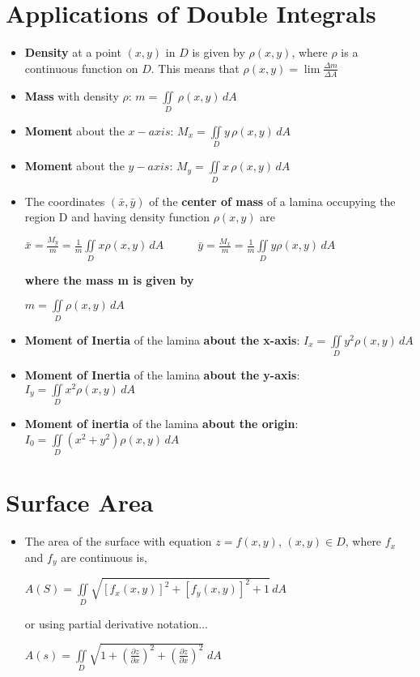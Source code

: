 \documentclass{report}
\begin{document}
	\section{Applications of Double Integrals}
		\begin{itemize}\addtolength{\leftskip}{2em}
			\item \textbf{Density} at a point $(x,y)$ in $D$ is given by $\rho(x,y)$, where $\rho$ is a continuous function on $D$. This means that $\rho(x,y)=\lim \frac{\Delta m}{\Delta A}$
			\item \textbf{Mass} with density $\rho$: $m=\iint\limits_{D}\,\rho(x,y)\,dA$
			\item \textbf{Moment} about the $x-axis$: $M_x=\iint\limits_{D}^{}y\,\rho(x,y)\,dA$
			\item \textbf{Moment} about the $y-axis$: $M_y=\iint\limits_{D}^{}x\,\rho(x,y)\,dA$
			\item The coordinates $(\bar{x},\bar{y})$ of the \textbf{center of mass} of a lamina occupying the region D and having density function $\rho(x,y)$ are 
			\begin{center}
				$\bar{x}=\frac{M_y}{m}=\frac{1}{m}\iint\limits_{D}x\rho(x,y)\,dA\quad\quad\quad\bar{y}=\frac{M_x}{m}=\frac{1}{m}\iint\limits_{D}y\rho(x,y)\,dA$
			\end{center}
			\begin{center}
			\textbf{where the mass m is given by}
			\end{center}
			\begin{center}
			$m=\iint\limits_{D}\rho(x,y)\,dA$
			\end{center}
			\item \textbf{Moment of Inertia} of the lamina \textbf{about the x-axis}:
				$I_x=\iint\limits_{D}y^2\rho(x,y)\,dA$
			\item \textbf{Moment of Inertia} of the lamina \textbf{about the y-axis}:
				$I_y=\iint\limits_{D}x^2\rho(x,y)\,dA$
			\item \textbf{Moment of inertia} of the lamina \textbf{about the origin}:
				$I_0=\iint\limits_{D}(x^2+y^2)\rho(x,y)\,dA$
		\end{itemize}
	\section{Surface Area}
		\begin{itemize}\addtolength{\leftskip}{2em}
			\item The area of the surface with equation $z=f(x,y)$, $(x,y)\in D$, where $f_x$ and $f_y$ are continuous is,
			\begin{center}
				\Large$A(S)=\iint\limits_{D}^{}\sqrt{[f_x(x,y)]^2+[f_y(x,y)]^2+1}\,dA$
			\end{center}
			\begin{center}
			or using partial derivative notation...
			\end{center}
			\begin{center}
			\Large$A(s)=\iint\limits_{D}\sqrt{1+(\frac{\partial z}{\partial x})^2+(\frac{\partial z}{\partial x})^2}\;dA$
			\end{center}
		\end{itemize}
\end{document}
